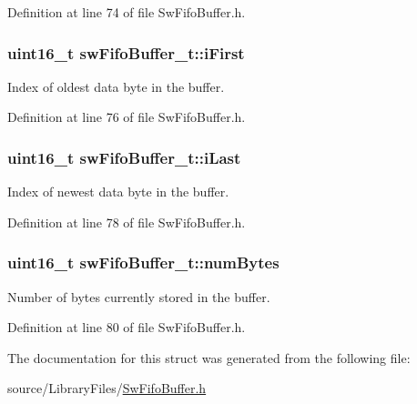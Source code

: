 Definition at line 74 of file Sw\+Fifo\+Buffer.\+h.

\hypertarget{structsw_fifo_buffer__t_a407513a78db2ae65a38a95646668164e}{}
\subsubsection[{i\+First}]{\setlength{\rightskip}{0pt plus 5cm}uint16\+\_\+t sw\+Fifo\+Buffer\+\_\+t\+::i\+First}\label{structsw_fifo_buffer__t_a407513a78db2ae65a38a95646668164e}
Index of oldest data byte in the buffer. 

Definition at line 76 of file Sw\+Fifo\+Buffer.\+h.

\hypertarget{structsw_fifo_buffer__t_a37b7c86bf28a0d6c402cd80d41a7abd1}{}
\subsubsection[{i\+Last}]{\setlength{\rightskip}{0pt plus 5cm}uint16\+\_\+t sw\+Fifo\+Buffer\+\_\+t\+::i\+Last}\label{structsw_fifo_buffer__t_a37b7c86bf28a0d6c402cd80d41a7abd1}
Index of newest data byte in the buffer. 

Definition at line 78 of file Sw\+Fifo\+Buffer.\+h.

\hypertarget{structsw_fifo_buffer__t_a05db6308e5fee7d2591c4bc4e21505da}{}
\subsubsection[{num\+Bytes}]{\setlength{\rightskip}{0pt plus 5cm}uint16\+\_\+t sw\+Fifo\+Buffer\+\_\+t\+::num\+Bytes}\label{structsw_fifo_buffer__t_a05db6308e5fee7d2591c4bc4e21505da}
Number of bytes currently stored in the buffer. 

Definition at line 80 of file Sw\+Fifo\+Buffer.\+h.



The documentation for this struct was generated from the following file\+:\begin{DoxyCompactItemize}
\item 
source/\+Library\+Files/\hyperlink{_sw_fifo_buffer_8h}{Sw\+Fifo\+Buffer.\+h}\end{DoxyCompactItemize}
